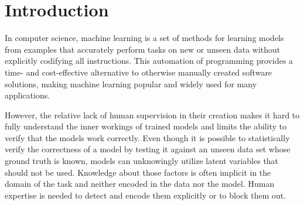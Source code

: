 \chapter{Introduction}
In computer science, machine learning is a set of methods for learning models from examples that accurately perform tasks on new or unseen data without explicitly codifying all instructions. This automation of programming provides a time- and cost-effective alternative to otherwise manually created software solutions, making machine learning popular and widely used for many applications.

However, the relative lack of human supervision in their creation makes it hard to fully understand the inner workings of trained models and limits the ability to verify that the models work correctly. Even though it is possible to statistically verify the correctness of a model by testing it against an unseen data set whose ground truth is known, models can unknowingly utilize latent variables that should not be used. Knowledge about those factors is often implicit in the domain of the task and neither encoded in the data nor the model. Human expertise is needed to detect and encode them explicitly or to block them out.





% 


